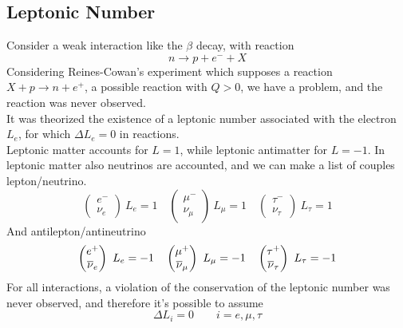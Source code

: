 \documentclass[../qm.tex]{subfiles}
\begin{document}
\subsection{Leptonic Number}
Consider a weak interaction like the $\beta$ decay, with reaction
\begin{equation*}
	n\to p+e^-+X
\end{equation*}
Considering Reines-Cowan's experiment which supposes a reaction $X+p\to n+e^+$, a possible reaction with $Q>0$, we have a problem, and the reaction was never observed.\\
It was theorized the existence of a leptonic number associated with the electron $L_e$, for which $\Delta L_e=0$ in reactions.\\
Leptonic matter accounts for $L=1$, while leptonic antimatter for $L=-1$. In leptonic matter also neutrinos are accounted, and we can make a list of couples lepton/neutrino.
\begin{equation}
	\begin{pmatrix}
		e^-\\\nu_e
	\end{pmatrix}\ L_e=1\quad\begin{pmatrix}
		\mu^-\\
		\nu_\mu
	\end{pmatrix}\ L_\mu=1\quad\begin{pmatrix}
		\tau^-\\
		\nu_\tau
	\end{pmatrix}\ L_\tau=1
	\label{eq:matterleptons}
\end{equation}
And antilepton/antineutrino
\begin{equation}
	\begin{pmatrix}
		e^+\\\overline{\nu}_e
	\end{pmatrix}\ L_e=-1\quad\begin{pmatrix}
		\mu^+\\
		\overline{\nu}_\mu
	\end{pmatrix}\ L_\mu=-1\quad\begin{pmatrix}
		\tau^+\\
		\overline{\nu}_\tau
	\end{pmatrix}\ L_\tau=-1
	\label{eq:antimatterleptons}
\end{equation}
For all interactions, a violation of the conservation of the leptonic number was never observed, and therefore it's possible to assume
\begin{equation}
	\Delta L_i=0\qquad i=e,\mu,\tau
	\label{eq:leptonselectionrule}
\end{equation}
\end{document}
